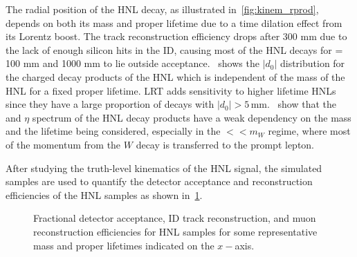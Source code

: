 The radial position of the HNL decay, as illustrated in~\cref{fig:kinem_rprod}, depends on both its mass and proper lifetime due to a time dilation effect from its Lorentz boost. The track reconstruction efficiency drops after 300 mm due to the lack of enough silicon hits in the ID, causing most of the HNL decays for \ctau = 100 mm and 1000 mm to lie outside acceptance.~ shows the $|d_0|$ distribution for the charged decay products of the HNL which is independent of the mass of the HNL for a fixed proper lifetime. LRT adds sensitivity to higher lifetime HNLs since they have a large proportion of decays with $|d_0|>5\,$mm.~ show that the \pT and $\eta$ spectrum of the HNL decay products have a weak dependency on the mass and the lifetime being considered, especially in the \mhnl$<<m_W$ regime, where most of the momentum from the $W$ decay is transferred to the prompt lepton.

After studying the truth-level kinematics of the HNL signal, the simulated samples are used to quantify the detector acceptance and reconstruction efficiencies of the HNL samples as shown in~\cref{fig:acc_and_eff}.

\begin{figure}[!ht]
    \centering
     \caption{Fractional detector acceptance, ID track reconstruction, and muon reconstruction efficiencies for \uuu HNL samples for some representative mass and proper lifetimes indicated on the $x-$axis.}
     \label{fig:acc_and_eff}
 \end{figure}


